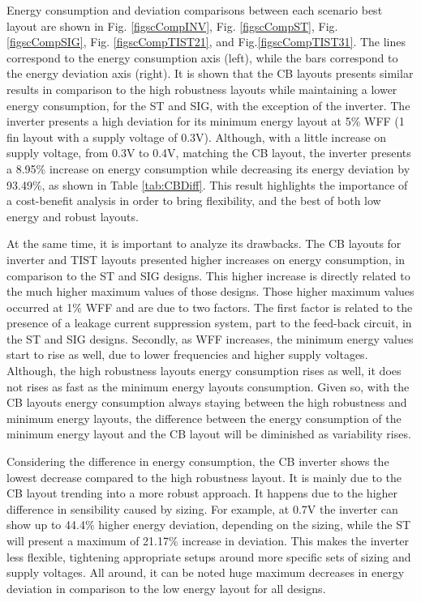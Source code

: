 \documentclass[pgmicro,mestrado,english]{iiufrgs}
\begin{document}
    Energy consumption and deviation comparisons between each scenario best layout are shown in Fig. \ref{figscCompINV}, Fig. \ref{figscCompST}, Fig. \ref{figscCompSIG}, Fig. \ref{figscCompTIST21}, and Fig.\ref{figscCompTIST31}. The lines correspond to the energy consumption axis (left), while the bars correspond to the energy deviation axis (right). It is shown that the CB layouts presents similar results in comparison to the high robustness layouts while maintaining a lower energy consumption, for the ST and SIG, with the exception of the inverter. The inverter presents a high deviation for its minimum energy layout at 5\% WFF (1 fin layout with a supply voltage of 0.3V). Although, with a little increase on supply voltage, from 0.3V to 0.4V, matching the CB layout, the inverter presents a 8.95\% increase on energy consumption while decreasing its energy deviation by 93.49\%, as shown in Table \ref{tab:CBDiff}. This result highlights the importance of a cost-benefit analysis in order to bring flexibility, and the best of both low energy and robust layouts.

    At the same time, it is important to analyze its drawbacks. The CB layouts for inverter and TIST layouts presented higher increases on energy consumption, in comparison to the ST and SIG designs. This higher increase is directly related to the much higher maximum values of those designs. Those higher maximum values occurred at 1\% WFF and are due to two factors. The first factor is related to the presence of a leakage current suppression system, part to the feed-back circuit, in the ST and SIG designs. Secondly, as WFF increases, the minimum energy values start to rise as well, due to lower frequencies and higher supply voltages. Although, the high robustness layouts energy consumption rises as well, it does not rises as fast as the minimum energy layouts consumption. Given so, with the CB layouts energy consumption always staying between the high robustness and minimum energy layouts, the difference between the energy consumption of the minimum energy layout and the CB layout will be diminished as variability rises.

    Considering the difference in energy consumption, the CB inverter shows the lowest decrease compared to the high robustness layout. It is mainly due to the CB layout trending into a more robust approach. It happens due to the higher difference in sensibility caused by sizing. For example, at 0.7V the inverter can show up to 44.4\% higher energy deviation, depending on the sizing, while the ST will present a maximum of 21.17\% increase in deviation. This makes the inverter less flexible, tightening appropriate setups around more specific sets of sizing and supply voltages. All around, it can be noted huge maximum decreases in energy deviation in comparison to the low energy layout for all designs.
\end{document}
